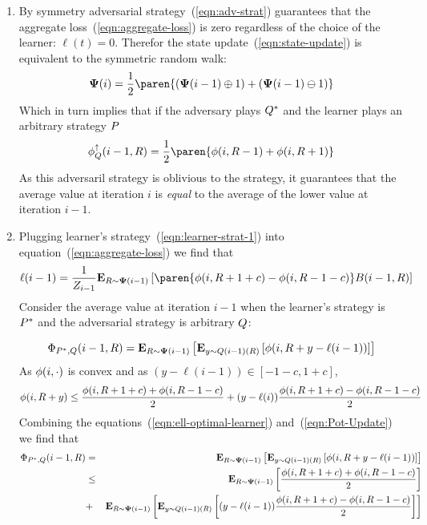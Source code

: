 \documentclass{article}[12pt]
\begin{document}
\proof
\begin{enumerate}
\item By symmetry adversarial strategy~(\ref{eqn:adv-strat}) guarantees that
  the aggregate loss~(\ref{eqn:aggregate-loss}) is zero regardless of
  the choice of the learner: $\ell(t)=0$.
  Therefor the state update~(\ref{eqn:state-update}) is equivalent to
  the symmetric random walk:
  $$\state(i) = \frac{1}{2} \paren{(\state(i-1) \oplus 1) + (\state(i-1)
    \ominus 1)}$$
  Which in turn implies that if the adversary plays $Q^*$
  and the learner plays an arbitrary strategy $P$
  \begin{equation} \label{eqn:lower}
    \lowerpot(i-1,\R) = \frac{1}{2} \paren{\pot(i,\R-1)+\pot(i,\R+1)}
  \end{equation}
  As this adversaril strategy is oblivious to the strategy, it
  guarantees that the average value at iteration $i$ is {\em equal} to the
  average of the lower value at iteration $i-1$.
\item
 Plugging learner's strategy~(\ref{eqn:learner-strat-1}) into equation~(\ref{eqn:aggregate-loss}) we find that
 \begin{equation} \label{eqn:ell-optimal-learner}
   \ell(i-1) = \frac{1}{Z_{i-1}} \E{\R \sim \state(i-1)}{\paren{\pot(i,\R+1+c)-\pot(i,\R-1-c)}
   \Bias(i-1,\R)}
\end{equation}
  Consider the average value at iteration $i-1$ when the learner's strategy
  is $P^*$ and the adversarial strategy is arbitrary $Q$:
  
   \begin{equation} \label{eqn:Pot-Update}
    \Phi_{P^*,Q}(i-1,R) = {\bf E}_{R \sim {\bf \Psi}(i-1)}\left[  {\bf E}_{y \sim
      Q(i-1)(R)}\left[ \phi(i,R+y-\ell(i-1)) \right] \right]
  \end{equation}
  As $\phi(i,\cdot)$ is convex and as $(y-\ell(i-1)) \in [-1-c,1+c]$,
  \begin{equation} \label{eqn:pot-upper}
    \phi(i,R+y) \leq \frac{\phi(i,R+1+c)+\phi(i,R-1-c)}{2} +
    (y-\ell(i)) \frac{\phi(i,R+1+c)-\phi(i,R-1-c)}{2}
    \end{equation}
  Combining the equations~(\ref{eqn:ell-optimal-learner}) and~(\ref{eqn:Pot-Update}) we find that
  \begin{eqnarray}
  \Phi_{P^*,Q}(i-1,R)&=&{\bf E}_{R \sim {\bf \Psi}(i-1)}\left[ {\bf E}_{y \sim Q(i-1)(R)}\left[ \phi(i,R+y-\ell(i-1)) \right] \right]\\
  &\leq & {\bf E}_{R \sim {\bf \Psi}(i-1)}\left[ \frac{\phi(i,R+1+c)+\phi(i,R-1-c)}{2} \right]\\
  &+&
  {\bf E}_{R \sim {\bf \Psi}(i-1)}\left[ {\bf E}_{y \sim Q(i-1)(R)}\left[ (y-\ell(i-1)) \frac{\phi(i,R+1+c)-\phi(i,R-1-c)}{2} \right] \right] \label{eqn:zero-term}
  \end{eqnarray}
  

\end{enumerate}
\end{document}

